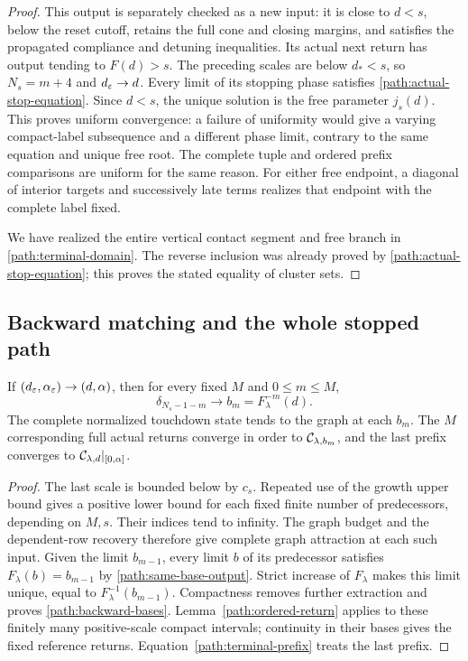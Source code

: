 \begin{proof}
This output is separately checked as a new input: it is close to
$d<s$, below the reset cutoff, retains the full cone and closing
margins, and satisfies the propagated compliance and detuning
inequalities.  Its actual next return has output tending to
$F(d)>s$.  The preceding scales are below $d_*<s$, so
$N_s=m+4$ and $d_\varepsilon\to d$.  Every limit of its stopping phase
satisfies \eqref{path:actual-stop-equation}.  Since $d<s$, the
unique solution is the free parameter $j_s(d)$.  This proves
uniform convergence: a failure of uniformity would give a varying
compact-label subsequence and a different phase limit, contrary to
the same equation and unique free root.  The complete tuple and
ordered prefix comparisons are uniform for the same reason.
For either free endpoint, a diagonal of interior targets and
successively late terms realizes that endpoint with the complete
label fixed.

We have realized the entire vertical contact segment and
free branch in \eqref{path:terminal-domain}.  The reverse inclusion
was already proved by \eqref{path:actual-stop-equation}; this proves
the stated equality of cluster sets.
\end{proof}

\subsection{Backward matching and the whole stopped path}

\begin{lemma}
\label{path:backward-match}
If $(d_\varepsilon,\alpha_\varepsilon)\to(d,\alpha)$, then for every fixed
$M$ and $0\le m\le M$,
\begin{equation}
 \delta_{N_s-1-m}\longrightarrow b_m=F_\lambda^{-m}(d).
 \label{path:backward-bases}
\end{equation}
The complete normalized touchdown state tends to the graph at each $b_m$.
The $M$ corresponding full actual returns converge in order to
$\mathcal C_{\lambda,b_m}$, and the last prefix converges to
$\mathcal C_{\lambda,d}|_{[0,\alpha]}$.
\end{lemma}

\begin{proof}
The last scale is bounded below by $c_s$.  Repeated use of the
growth upper bound gives a positive lower bound for each fixed
finite number of predecessors, depending on $M,s$.  Their indices
tend to infinity.  The graph budget and the dependent-row recovery
therefore give complete graph attraction at each such input.
Given the limit $b_{m-1}$, every limit $b$ of its predecessor
satisfies $F_\lambda(b)=b_{m-1}$ by
\eqref{path:same-base-output}.  Strict increase of $F_\lambda$
makes this limit unique, equal to $F_\lambda^{-1}(b_{m-1})$.
Compactness removes further extraction and proves
\eqref{path:backward-bases}.  Lemma~\ref{path:ordered-return}
applies to these finitely many positive-scale compact intervals;
continuity in their bases gives the fixed reference returns.
Equation~\eqref{path:terminal-prefix} treats the last prefix.
\end{proof}

